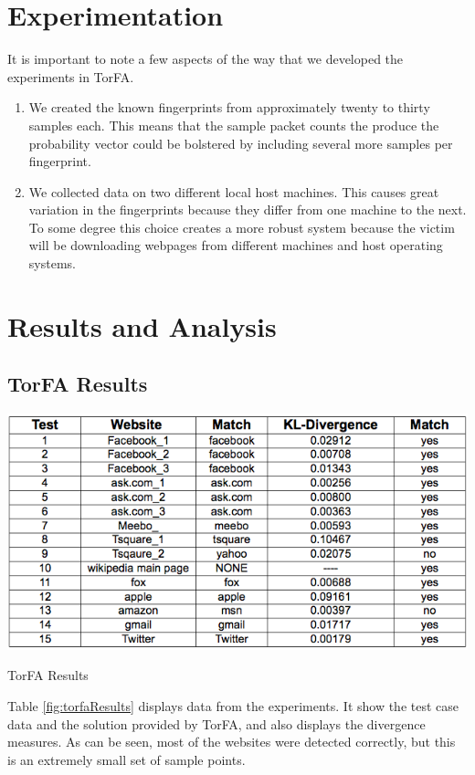 \documentclass{article}
\begin{document}
\section{Experimentation}
It is important to note a few aspects of the way that we developed the 
experiments in TorFA. 
\begin{enumerate}
	\item We created the known fingerprints from approximately twenty to 
		thirty samples each. This means that the sample packet counts the 
		produce the probability vector could be bolstered by including several 
		more samples per fingerprint. 
	\item We collected data on two different local host machines. This causes
		great variation in the fingerprints because they differ from one machine
		to the next. To some degree this choice creates a more robust system
		because the victim will be downloading webpages from different machines 
		and host operating systems. 
\end{enumerate}

\section{Results and Analysis}

\subsection{TorFA Results}
\begin{table}[h]
	\centering
		\includegraphics[scale=.6]{../finalpres/results.png}
	\caption{TorFA Results}
	\label{fig:torfaResults}
\end{table}
Table \ref{fig:torfaResults} displays data from the experiments. It show
the test case data and the solution provided by TorFA, and also displays
the divergence measures. As can be seen, most of the websites were detected 
correctly, but this is an extremely small set of sample points.
\end{document}
